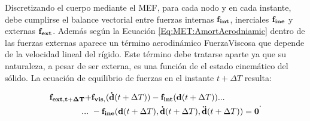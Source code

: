 %
%
%

Discretizando el cuerpo mediante el MEF, para cada nodo y en cada instante, debe cumplirse el balance vectorial entre fuerzas internas $\bf{f}_{int}$, inerciales $\bf{f}_{ine}$ y externas $\bf{f}_{ext}$. Además según la Ecuación \eqref{Eq:MET:AmortAerodniamic} dentro de las fuerzas externas aparece un término aerodinámico \gls{FuerzaViscosa} que depende de la velocidad lineal del rígido. Este término debe tratarse aparte ya que su naturaleza, a pesar de ser externa, es una función de el estado cinemático del sólido. La ecuación de equilibrio de fuerzas en el instante $t+\Delta T$ resulta:

\begin{equation}\label{Eq:MET:EquilibrioExacto}
	\begin{split}
		\bf{f}_{ext,t+\Delta T}+&\bf{f}_{vis,}(\dot{\bf{d}}\text{$(t+\Delta T)$})-\bf{f}_{int}(\bf{d}\text{$(t+\Delta T)$})...\\
		...~&-\bf{f}_{ine}(\bf{d} \text{$(t+\Delta T)$},\dot{\bf{d}}\text{$(t+\Delta T)$},\ddot{\bf{d}}\text{$(t+\Delta T)$})=0
	\end{split}.
\end{equation}

